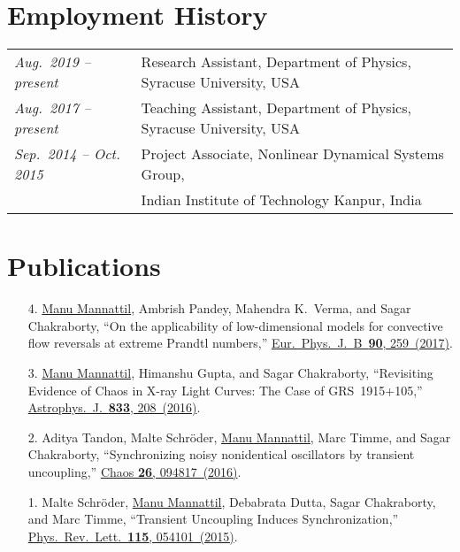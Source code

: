\documentclass[10pt]{article}
\newcommand{\bname}{\underline{Manu Mannattil}} %
\providecommand{\doi}[2]{\href{https://dx.doi.org/#1}{#2}}
\begin{document}

\section*{Employment History}

\begin{tabular}{@{}ll}
  \emph{Aug.~2019 -- present}   & Research Assistant, Department of Physics, Syracuse University, USA\\
  \emph{Aug.~2017 -- present}   & Teaching Assistant, Department of Physics, Syracuse University, USA\\
  \emph{Sep.~2014 -- Oct. 2015} & Project Associate, Nonlinear Dynamical Systems Group,\\
                                & Indian Institute of Technology Kanpur, India
\end{tabular}


\section*{Publications}


\begin{enumerate}[itemsep=0pt,leftmargin=20pt]
  \item[4.] \bname, Ambrish Pandey, Mahendra K.~Verma, and Sagar Chakraborty, ``On the applicability of low-dimensional models for convective flow reversals at extreme Prandtl numbers,'' \doi{10.1140/epjb/e2017-80391-1}{Eur.~Phys.~J.~B~\textbf{90}, 259~(2017)}.
  \item[3.] \bname, Himanshu Gupta, and Sagar Chakraborty, ``Revisiting Evidence of Chaos in X-ray Light Curves: The Case of GRS~1915+105,'' \doi{10.3847/1538-4357/833/2/208}{Astrophys.~J.~\textbf{833}, 208~(2016)}.
  \item[2.] Aditya Tandon, Malte Schr\"{o}der, \bname, Marc Timme, and Sagar Chakraborty, ``Synchronizing noisy nonidentical oscillators by transient uncoupling,'' \doi{10.1063/1.4959141}{Chaos \textbf{26}, 094817~(2016)}.
  \item[1.] Malte Schr\"{o}der, \bname, Debabrata Dutta, Sagar Chakraborty, and Marc Timme, ``Transient Uncoupling Induces Synchronization,'' \doi{10.1103/PhysRevLett.115.054101}{Phys.~Rev.~Lett.~\textbf{115}, 054101~(2015)}.
\end{enumerate}
\end{document}
